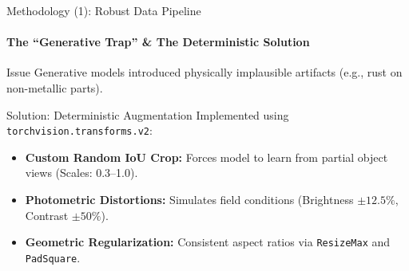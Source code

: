 \documentclass{beamer}
\begin{document}
\begin{frame}{Methodology (1): Robust Data Pipeline}
    \framesubtitle{The ``Generative Trap'' \& The Deterministic Solution}
    
    \begin{alertblock}{Issue}
        Generative models introduced physically implausible artifacts (e.g., rust on non-metallic parts).
    \end{alertblock}

    \begin{block}{Solution: Deterministic Augmentation}
        Implemented using \texttt{torchvision.transforms.v2}:
        \begin{itemize}
            \item \textbf{Custom Random IoU Crop:} Forces model to learn from partial object views (Scales: 0.3--1.0).
            \item \textbf{Photometric Distortions:} Simulates field conditions (Brightness $\pm 12.5\%$, Contrast $\pm 50\%$).
            \item \textbf{Geometric Regularization:} Consistent aspect ratios via \texttt{ResizeMax} and \texttt{PadSquare}.
        \end{itemize}
    \end{block}
\end{frame}
\end{document}
